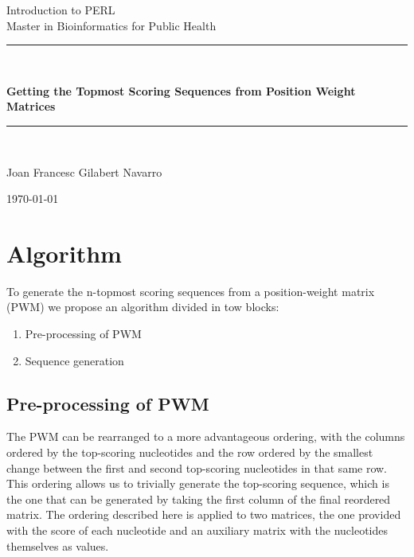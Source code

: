 \documentclass[10pt]{article}
\author{}
\title{}
\date{\today}
\newcommand{\HRule}{\rule{\linewidth}{0.5mm}}
\begin{document}
\begin{titlepage}
\begin{center}
\LARGE{Introduction to PERL\\ Master in Bioinformatics for Public Health }\\
\end{center}

\vspace{4.5cm}

\HRule \\[0.4cm]
\begin{center}
{ \Huge \bfseries Getting the Topmost Scoring Sequences from Position Weight Matrices \\[0.8cm] }
\end{center}
\HRule \\[0.4cm]

\vspace{4.5cm}
\begin{center}
\huge{Joan Francesc Gilabert Navarro}\\
\vspace{0.5cm}
\begin{LARGE}
\today
\end{LARGE}
\end{center}
\end{titlepage}
\newpage
\section{Algorithm}

To generate the n-topmost scoring sequences from a position-weight matrix (PWM) we propose an algorithm divided in tow blocks:
\begin{enumerate}
\item Pre-processing of PWM
\item Sequence generation
\end{enumerate}

\subsection{Pre-processing of PWM}

The PWM can be rearranged to a more advantageous ordering, with the columns ordered by the top-scoring nucleotides and the row ordered by the smallest change between the first and second top-scoring nucleotides in that same row. This ordering allows us to trivially generate the top-scoring sequence, which is the one that can be generated by taking the first column of the final reordered matrix. The ordering described here is applied to two matrices, the one provided with the score of each nucleotide and an auxiliary matrix with the nucleotides themselves as values.\\
\end{document}
